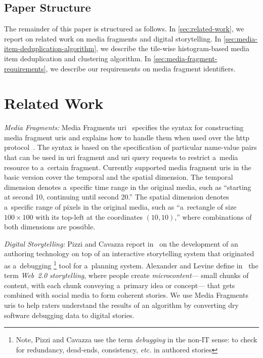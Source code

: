 \documentclass{article}
\begin{document}
\subsection{Paper Structure}
\label{sec:paper-structure}

The remainder of this paper is structured as follows.
In \autoref{sec:related-work}, we report on related work
on media fragments and digital storytelling.
In \autoref{sec:media-item-deduplication-algorithm},
we describe the tile-wise histogram-based
media item deduplication and clustering algorithm.
In \autoref{sec:media-fragment-requirements}, we describe
our requirements on media fragment identifiers.

\section{Related Work}
\label{sec:related-work}

\noindent \textit{Media Fragments:}
Media Fragments {\sc uri}~\cite{troncy2012mediafragments} specifies
the syntax for constructing media fragment {\sc uri}s
and explains how to handle them
when used over the {\sc http} protocol~\cite{fielding1999http}.
The syntax is based on the specification of particular name-value pairs
that can be used in {\sc uri} fragment and {\sc uri} query requests
to restrict a~media resource to a~certain fragment.
Currently supported media fragment {\sc uri}s in the basic version
cover the temporal and the spatial dimension.
The temporal dimension denotes a~specific time range in the original media,
such as ``starting at second 10, continuing until second 20.''
The spatial dimension denotes a~specific range of pixels in the original media,
such as ``a~rectangle of size $ 100 \times 100 $
with its top-left at the coordinates $ (10, 10) $,''
where combinations of both dimensions are possible.

\noindent \textit{Digital Storytelling:}
Pizzi and Cavazza report in~\cite{pizzi2008debugging} on the development of
an authoring technology on top of an interactive storytelling system
that originated as a~debugging%
\footnote{Note, Pizzi and Cavazza use the term \emph{debugging} in the non-IT sense:
to check for redundancy, dead-ends, consistency, \emph{etc.} in authored stories}
tool for a~planning system.
Alexander and Levine define in~\cite{alexander2008storytelling}
the term \emph{Web~2.0 storytelling}, where people create \emph{microcontent}---%
small chunks of content, with each chunk conveying a~primary idea or concept---%
that gets combined with social media to form coherent stories.
We use Media Fragments {\sc uri}s to help raters understand
the results of an algorithm by converting dry software debugging data
to digital stories.
\end{document}
